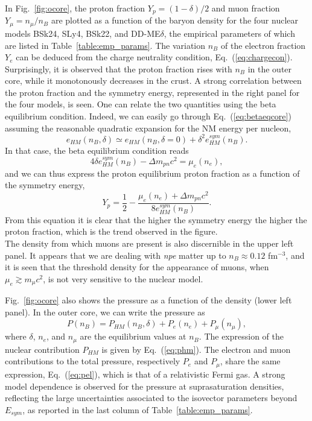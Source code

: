 In Fig.~\ref{fig:ocore}, the proton fraction $Y_p=(1-\delta)/2$ and muon 
fraction $Y_\mu = n_\mu/n_B$ are plotted as a function of the baryon density 
for the four nuclear models BSk24, SLy4, BSk22, and DD-ME$\delta$, the
empirical parameters of which are listed in Table~\ref{table:emp_params}. The
variation $n_B$ of the electron fraction $Y_e$ can be deduced from the
charge neutrality condition, Eq.~(\ref{eq:chargecon}). Surprisingly, it is
observed that the proton fraction rises with $n_B$ in the outer core, while 
it monotonously decreases in the crust. 
A strong correlation between the proton fraction and the symmetry energy,
represented in the right panel for the four models, is seen. One can relate the 
two quantities using the beta equilibrium condition. Indeed, we can easily go 
through Eq.~(\ref{eq:betaeqcore}) assuming the reasonable quadratic expansion 
for the NM energy per nucleon,
%
\begin{equation}
  e_{HM}(n_B,\delta) \simeq e_{HM}(n_B,\delta=0) + \delta^2 e_{HM}^{sym}(n_B).
\end{equation}
%
In that case, the beta equilibrium condition reads
%
\begin{equation}
  4\delta e_{HM}^{sym}(n_B) - \Delta m_{pn}c^2 = \mu_e(n_e),
\end{equation}
%
and we can thus express the proton equilibrium proton fraction as a function of 
the symmetry energy,
%
\begin{equation}
  Y_p = \frac{1}{2} - \frac{\mu_e(n_e) 
  + \Delta m_{pn}c^2}{8e_{HM}^{sym}(n_B)}.
\end{equation}
%
From this equation it is clear that the higher the symmetry energy the higher
the proton fraction, which is the trend observed in the figure.\\
The density from which muons are present is also discernible in the upper left
panel. It appears that we are dealing with \textit{npe} matter up to 
$n_B \approx 0.12$ fm$^{-3}$, and it is seen that the threshold density for the
appearance of muons, when $\mu_e \gtrsim m_\mu c^2$, is not very sensitive to 
the nuclear model.

Fig.~\ref{fig:ocore} also shows the pressure as a function of the density
(lower left panel). In the outer core, we can write the pressure as
%
\begin{equation}
  P(n_B) = P_{HM}(n_B, \delta) + P_e(n_e) + P_\mu(n_\mu),
\end{equation}
%
where $\delta$, $n_e$, and $n_\mu$ are the equilibrium values at $n_B$. The
expression of the nuclear contribution $P_{HM}$ is given by
Eq.~(\ref{eq:phm}). The electron and muon contributions to the total pressure, 
respectively $P_e$ and $P_\mu$, share the same expression, Eq.~(\ref{eq:pel}), 
which is that of a relativistic Fermi gas. A strong model dependence is
observed for the pressure at suprasaturation densities, reflecting the large
uncertainties associated to the isovector parameters beyond $E_{sym}$, as
reported in the last column of Table~\ref{table:emp_params}.

